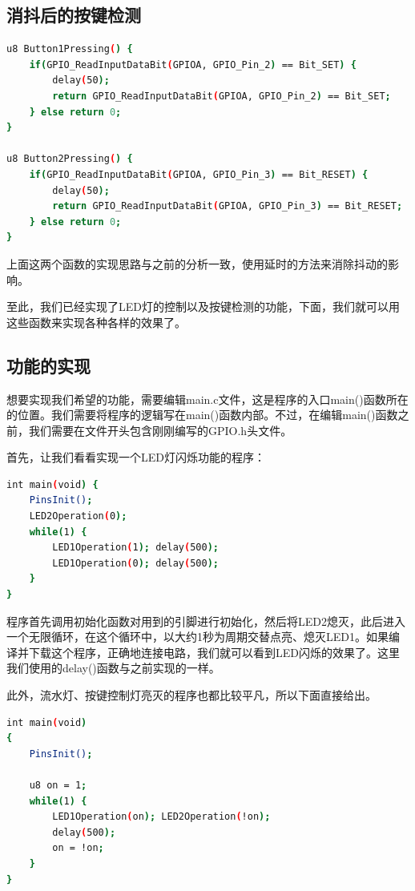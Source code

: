 	\subsection{消抖后的按键检测}
		\par 
		\begin{lstlisting}[language=bash, style=customStyleC, caption=消抖后的按键检测函数]
u8 Button1Pressing() {
	if(GPIO_ReadInputDataBit(GPIOA, GPIO_Pin_2) == Bit_SET) {
		delay(50);
		return GPIO_ReadInputDataBit(GPIOA, GPIO_Pin_2) == Bit_SET;
	} else return 0;
}

u8 Button2Pressing() {
	if(GPIO_ReadInputDataBit(GPIOA, GPIO_Pin_3) == Bit_RESET) {
		delay(50);
		return GPIO_ReadInputDataBit(GPIOA, GPIO_Pin_3) == Bit_RESET;
	} else return 0;
}
		\end{lstlisting}
		\par 
		上面这两个函数的实现思路与之前的分析一致，使用延时的方法来消除抖动的影响。
		\par 
		至此，我们已经实现了LED灯的控制以及按键检测的功能，下面，我们就可以用这些函数来实现各种各样的效果了。
	\subsection{功能的实现}
		想要实现我们希望的功能，需要编辑main.c文件，这是程序的入口main()函数所在的位置。我们需要将程序的逻辑写在main()函数内部。不过，在编辑main()函数之前，我们需要在文件开头包含刚刚编写的GPIO.h头文件。
		\par
		首先，让我们看看实现一个LED灯闪烁功能的程序：
		\par
		\begin{lstlisting}[language=bash, style=customStyleC, caption=LED灯闪烁]
int main(void) {
	PinsInit();
	LED2Operation(0);
	while(1) {
		LED1Operation(1); delay(500);
		LED1Operation(0); delay(500);
	}
}
		\end{lstlisting}
		\newpage
		\par 
		程序首先调用初始化函数对用到的引脚进行初始化，然后将LED2熄灭，此后进入一个无限循环，在这个循环中，以大约1秒为周期交替点亮、熄灭LED1。如果编译并下载这个程序，正确地连接电路，我们就可以看到LED闪烁的效果了。这里我们使用的delay()函数与之前实现的一样。
		\par 
		此外，流水灯、按键控制灯亮灭的程序也都比较平凡，所以下面直接给出。
		\par
		\begin{lstlisting}[language=bash, style=customStyleC, caption=流水灯]
int main(void)
{
	PinsInit();
	
	u8 on = 1;    
	while(1) {
		LED1Operation(on); LED2Operation(!on);
		delay(500);
		on = !on;
	}
}
		\end{lstlisting}
		\par 

